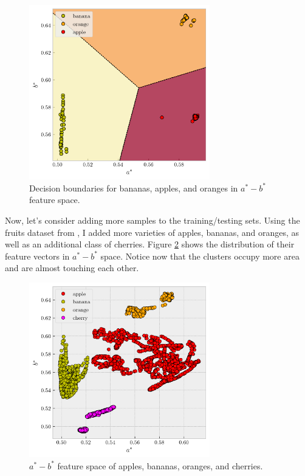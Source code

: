 \documentclass[12pt,a4paper]{article}
\begin{document}
\begin{figure}[htb]
	\centering
	\includegraphics[width=0.7\textwidth]{ban-app-ora-decision.png}
	\caption{Decision boundaries for bananas, apples, and oranges in $a^*-b^*$ feature space.}
	\label{fig:fruit-decision3}
\end{figure}

Now, let's consider adding more samples to the training/testing sets. Using the fruits dataset from \cite{kaggle}, I added more varieties of apples, bananas, and oranges, as well as an additional class of cherries. Figure \ref{fig:fruits-set} shows the distribution of their feature vectors in $a^*-b^*$ space. Notice now that the clusters occupy more area and are almost touching each other.

\begin{figure}[htb]
	\centering
	\includegraphics[width=0.7\textwidth]{fruits-train.png}
	\caption{$a^*-b^*$ feature space of apples, bananas, oranges, and cherries.}
	\label{fig:fruits-set}
\end{figure}
\end{document}
